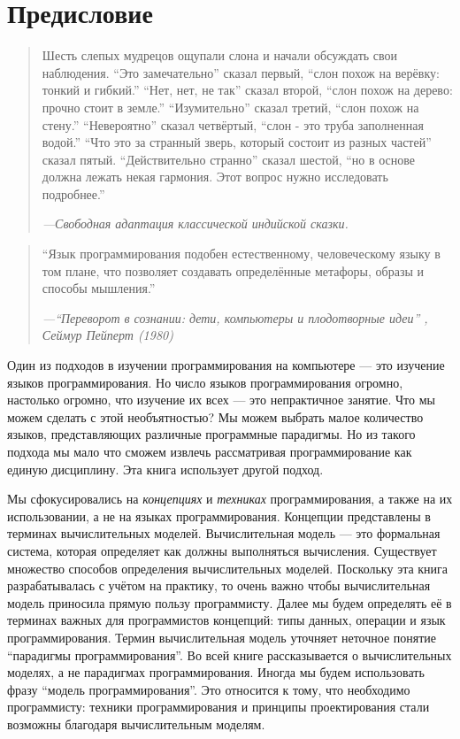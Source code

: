 \chapter*{Предисловие}

\begin{quote}
  Шесть слепых мудрецов ощупали слона и начали обсуждать свои наблюдения. ``Это замечательно'' сказал первый, ``слон похож на верёвку: тонкий и гибкий.'' ``Нет, нет, не так'' сказал второй, ``слон похож на дерево: прочно стоит в земле.'' ``Изумительно'' сказал третий, ``слон похож на стену.'' ``Невероятно'' сказал четвёртый, ``слон - это труба заполненная водой.'' ``Что это за странный зверь, который состоит из разных частей'' сказал пятый. ``Действительно странно'' сказал шестой, ``но в основе должна лежать некая гармония. Этот вопрос нужно исследовать подробнее.''

  \emph{---Свободная адаптация классической индийской сказки.}
\end{quote}

\begin{quote}
  ``Язык программирования подобен естественному, человеческому языку в том плане, что позволяет создавать определённые метафоры, образы и способы мышления.''

  \emph{---``Переворот в сознании: дети, компьютеры и плодотворные идеи'' \cite{141}, Сеймур Пейперт (1980)}
\end{quote}

Один из подходов в изучении программирования на компьютере --- это изучение языков программирования. Но число языков программирования огромно, настолько огромно, что изучение их всех --- это непрактичное занятие. Что мы можем сделать с этой необъятностью? Мы можем выбрать малое количество языков, представляющих различные программные парадигмы. Но из такого подхода мы мало что сможем извлечь рассматривая программирование как единую дисциплину. Эта книга использует другой подход.

Мы сфокусировались на \emph{концепциях} и \emph{техниках} программирования, а также на их использовании, а не на языках программирования. Концепции представлены в терминах вычислительных моделей. Вычислительная модель --- это формальная система, которая определяет как должны выполняться вычисления. Существует множество способов определения вычислительных моделей. Поскольку эта книга разрабатывалась с учётом на практику, то очень важно чтобы вычислительная модель приносила прямую пользу программисту. Далее мы будем определять её в терминах важных для программистов концепций: типы данных, операции и язык программирования. Термин вычислительная модель уточняет неточное понятие ``парадигмы программирования''. Во всей книге рассказывается о вычислительных моделях, а не парадигмах программирования. Иногда мы будем использовать фразу ``модель программирования''. Это относится к тому, что необходимо программисту: техники программирования и принципы проектирования стали возможны благодаря вычислительным моделям.

